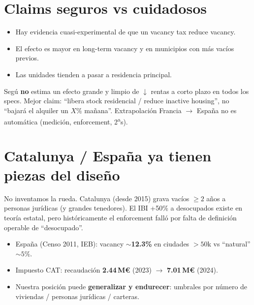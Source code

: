 \documentclass[11pt,a4paper]{report}
\begin{document}
\section{Claims seguros vs cuidadosos}

\begin{dato}[title={Claims seguros (decir en presentaci\'on)}]
\begin{itemize}
  \item Hay evidencia cuasi-experimental de que un vacancy tax reduce vacancy.
  \item El efecto es mayor en long-term vacancy y en municipios con m\'as vac\'ios previos.
  \item Las unidades tienden a pasar a residencia principal.
\end{itemize}
\end{dato}

\begin{cuidado}
Seg\'u \textbf{no} estima un efecto grande y limpio de $\downarrow$ rentas a corto
plazo en todos los specs. Mejor claim: ``libera stock residencial / reduce
inactive housing'', no ``bajará el alquiler un $X\%$ mañana''.
Extrapolaci\'on Francia $\rightarrow$ Espa\~na no es autom\'atica (medici\'on, enforcement, 2\textsuperscript{a}s).
\end{cuidado}

\section{Catalunya / Espa\~na ya tienen piezas del dise\~no}

\begin{intuicion}
No inventamos la rueda. Catalunya (desde 2015) grava vac\'ios $\ge 2$ a\~nos a
personas jur\'idicas (y grandes tenedores). El IBI +50\% a desocupados existe
en teor\'ia estatal, pero hist\'oricamente el enforcement fall\'o por falta de
definici\'on operable de ``desocupado''.
\end{intuicion}

\begin{dato}
\begin{itemize}
  \item Espa\~na (Censo 2011, IEB): vacancy $\sim$\textbf{12.3\%} en ciudades $>50$k
        vs ``natural'' $\sim 5\%$.
  \item Impuesto CAT: recaudaci\'on \textbf{2.44\,M€} (2023) $\rightarrow$ \textbf{7.01\,M€} (2024).
  \item Nuestra posici\'on puede \textbf{generalizar y endurecer}: umbrales por
        n\'umero de viviendas / personas jur\'idicas / carteras.
\end{itemize}
\end{dato}
\end{document}
